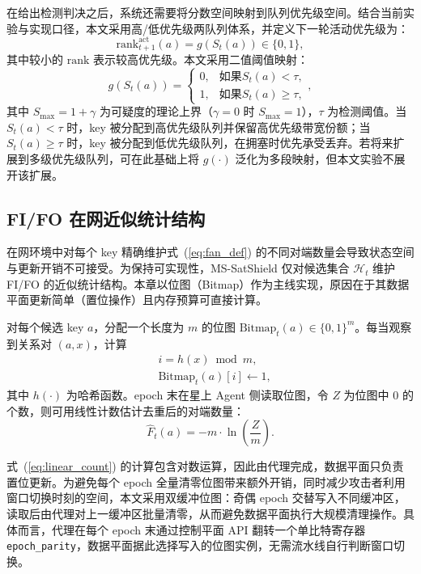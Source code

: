 在给出检测判决之后，系统还需要将分数空间映射到队列优先级空间。结合当前实验与实现口径，本文采用高/低优先级两队列体系，并定义下一轮活动优先级为：
\begin{equation}
\text{rank}_{t+1}^{\mathrm{act}}(a)=g(S_t(a))\in\{0,1\},
\label{eq:rank_map}
\end{equation}
其中较小的 $\text{rank}$ 表示较高优先级。本文采用二值阈值映射：
\begin{equation}
g(S_t(a))=\begin{cases}
0, & \text{如果} S_t(a)<\tau,\\
1, & \text{如果} S_t(a)\geq\tau,
\end{cases},
\label{eq:g_def}
\end{equation}
其中 $S_{\max}=1+\gamma$ 为可疑度的理论上界（$\gamma=0$ 时 $S_{\max}=1$），$\tau$ 为检测阈值。当 $S_t(a)<\tau$ 时，key 被分配到高优先级队列并保留高优先级带宽份额；当 $S_t(a)\geq\tau$ 时，key 被分配到低优先级队列，在拥塞时优先承受丢弃。若将来扩展到多级优先级队列，可在此基础上将 $g(\cdot)$ 泛化为多段映射，但本文实验不展开该扩展。

\subsection{FI/FO 在网近似统计结构}
在网环境中对每个 key 精确维护式~(\ref{eq:fan_def}) 的不同对端数量会导致状态空间与更新开销不可接受。为保持可实现性，MS-SatShield 仅对候选集合 $\mathcal{H}_t$ 维护 FI/FO 的近似统计结构。本章以位图（Bitmap）作为主线实现，原因在于其数据平面更新简单（置位操作）且内存预算可直接计算。

对每个候选 key $a$，分配一个长度为 $m$ 的位图 $\text{Bitmap}_t(a)\in\{0,1\}^m$。每当观察到关系对 $(a,x)$，计算
\begin{subequations}\label{eq:Bitmap_update}
\begin{align}
&i = h(x)\bmod m,
\label{eq:Bitmap_update_index}\\[0.35em]
&\text{Bitmap}_t(a)[i] \leftarrow 1,
\label{eq:Bitmap_update_set}
\end{align}
\end{subequations}
其中 $h(\cdot)$ 为哈希函数。epoch 末在星上 Agent 侧读取位图，令 $Z$ 为位图中 0 的个数，则可用线性计数估计去重后的对端数量：
\begin{equation}
\widehat{F}_t(a) = -m\cdot \ln\left(\frac{Z}{m}\right).
\label{eq:linear_count}
\end{equation}

式~(\ref{eq:linear_count}) 的计算包含对数运算，因此由代理完成，数据平面只负责置位更新。为避免每个 epoch 全量清零位图带来额外开销，同时减少攻击者利用窗口切换时刻的空间，本文采用双缓冲位图：奇偶 epoch 交替写入不同缓冲区，读取后由代理对上一缓冲区批量清零，从而避免数据平面执行大规模清理操作。具体而言，代理在每个 epoch 末通过控制平面 API 翻转一个单比特寄存器 \texttt{epoch\_parity}，数据平面据此选择写入的位图实例，无需流水线自行判断窗口切换。

